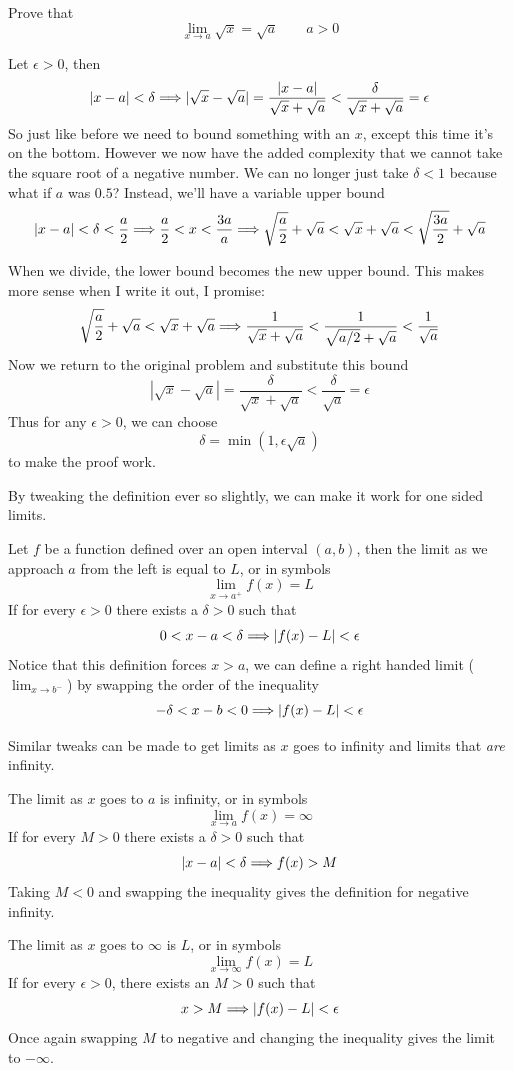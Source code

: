 \begin{example}
	Prove that
	\[ \lim_{x \to a} \sqrt{x} = \sqrt{a} \qquad a > 0 \]
	
	Let $\epsilon > 0$, then
	\[ |x - a| < \delta \Longrightarrow |\sqrt{x} - \sqrt{a}| = \frac{|x - a|}{\sqrt{x} + \sqrt{a}} < \frac{\delta}{\sqrt{x} + \sqrt{a}} = \epsilon \]
	So just like before we need to bound something with an $x$, except this time it's on the bottom. However we now have the added complexity that we cannot take the square root of a negative number. We can no longer just take $\delta < 1$ because what if $a$ was $0.5$? Instead, we'll have a variable upper bound
	\[ |x - a| < \delta < \frac{a}{2} \Longrightarrow \frac{a}{2} < x < \frac{3a}{a} \Longrightarrow \sqrt{\frac{a}{2}} + \sqrt{a} < \sqrt{x} + \sqrt{a} < \sqrt{\frac{3a}{2}} + \sqrt{a} \]
	
	When we divide, the lower bound becomes the new upper bound. This makes more sense when I write it out, I promise:
	\[ \sqrt{\frac{a}{2}} + \sqrt{a} < \sqrt{x} + \sqrt{a} \Longrightarrow \frac{1}{\sqrt{x} + \sqrt{a}} < \frac{1}{\sqrt{a/2} + \sqrt{a}} < \frac{1}{\sqrt{a}} \]
	Now we return to the original problem and substitute this bound
	\[ |\sqrt{x} - \sqrt{a}| = \frac{\delta}{\sqrt{x} + \sqrt{a}} < \frac{\delta}{\sqrt{a}} = \epsilon \]
	Thus for any $\epsilon > 0$, we can choose
	\[ \delta = \min(1, \epsilon\sqrt{a}) \]
	to make the proof work.
\end{example}

By tweaking the definition ever so slightly, we can make it work for one sided limits.

\begin{definition}
	Let $f$ be a function defined over an open interval $(a, b)$, then the limit as we approach $a$ from the left is equal to $L$, or in symbols
	\[ \lim_{x \to a^+} f(x) = L \]
	If for every $\epsilon > 0$ there exists a $\delta > 0$ such that
	\[ 0 < x - a < \delta \Longrightarrow |f(x) - L| < \epsilon \]
	Notice that this definition forces $x > a$, we can define a right handed limit ($\lim_{x \to b^-}$) by swapping the order of the inequality
	\[ -\delta < x - b < 0 \Longrightarrow |f(x) - L| < \epsilon\]
\end{definition}

Similar tweaks can be made to get limits as $x$ goes to infinity and limits that \emph{are} infinity.

\begin{definition}
	The limit as $x$ goes to $a$ is infinity, or in symbols
	\[ \lim_{x \to a} f(x) = \infty \]
	If for every $M > 0$ there exists a $\delta > 0$ such that
	\[ |x - a| < \delta \Longrightarrow f(x) > M \]
	Taking $M < 0$ and swapping the inequality gives the definition for negative infinity. 
	
	The limit as $x$ goes to $\infty$ is $L$, or in symbols
	\[ \lim_{x \to \infty} f(x) = L \]
	If for every $\epsilon > 0$, there exists an $M > 0$ such that
	\[ x > M \Longrightarrow |f(x) - L| < \epsilon \]
	Once again swapping $M$ to negative and changing the inequality gives the limit to $-\infty$.
\end{definition}

